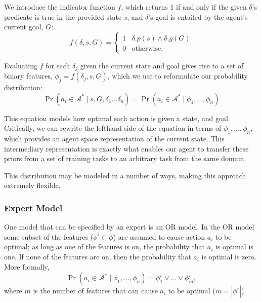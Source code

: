 \documentclass[11pt]{article}
\begin{document}
We introduce the indicator function $f$, which returns 1 if and only if the given $\delta$'s predicate is true in the provided state $s$, and $\delta$'s goal is entailed by the agent's current goal, $G$:
\begin{equation}
f(\delta, s, G) = 
\begin{cases}
1& \delta.p(s) \wedge \delta.g(G) \\
0& \text{otherwise.}
\end{cases}
\label{eq:f_func_def}
\end{equation}

Evaluating $f$ for each $\delta_j$ given the current state and goal gives rise to a set of binary features,
$\phi_j = f(\delta_j, s, G)$, which we use to reformulate our probability distribution:
\begin{equation}
\Pr(a_i \in \mathcal{A}^*  \mid s, G, \delta_1 \ldots \delta_n) = \Pr(a_i \in \mathcal{A}^*  \mid \phi_1, \ldots, \phi_n)
\label{eq:feature_rep}
\end{equation}

This equation models how optimal each action is given a state, and goal. Critically, we can rewrite the lefthand side of the equation in terms of $\phi_1, \ldots, \phi_n$, which provides an agent space representation of the current state. This intermediary representation is exactly what enables our agent to transfer these priors from a set of training tasks to an arbitrary task from the same domain.

This distribution may be modeled in a number of ways, making this approach extremely flexible.

\subsubsection{Expert Model} One model that can be specified by
an expert is an OR model.
In the OR model some subset of the features 
($\phi^i \subset \phi$) are
assumed to cause action $a_i$ to be optimal; as long as one of
the features is on, the probability that $a_i$ is optimal is one.
If none of the features are on, then the probability that $a_i$ is 
optimal is zero. More formally,
\begin{equation}
\Pr(a_i \in \mathcal{A}^*  \mid \phi_1, \ldots, \phi_n) = \phi_1^i \lor ... \lor \phi_m^i,
\end{equation}
where $m$ is the number of features that can cause $a_i$ to be optimal ($m = |\phi^i|$).
\end{document}
